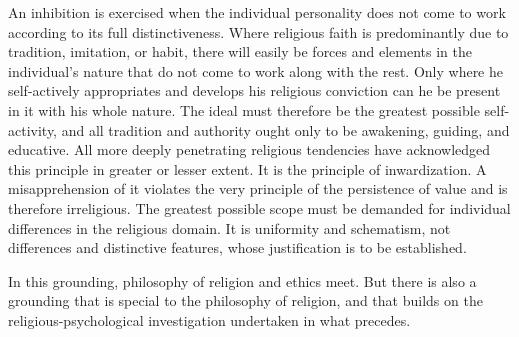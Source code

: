\documentclass[12pt,a4paper]{book}
\begin{document}
An inhibition is exercised when the individual personality does not come to work according to its full
distinctiveness. Where religious faith is predominantly due to tradition, imitation, or habit, there
will easily be forces and elements in the individual's nature that do not come to work along with the
rest. Only where he self-actively appropriates and develops his religious conviction can he be present
in it with his whole nature. The ideal must therefore be the greatest possible self-activity, and all
tradition and authority ought only to be awakening, guiding, and educative. All more deeply penetrating
religious tendencies have acknowledged this principle in greater or lesser extent. It is the principle
of inwardization. A misapprehension of it violates the very principle of the persistence of value and
is therefore irreligious. The greatest possible scope must be demanded for individual differences in
the religious domain. It is uniformity and schematism, not differences and distinctive features, whose
justification is to be established.

In this grounding, philosophy of religion and ethics meet. But there is also a grounding that is
special to the philosophy of religion, and that builds on the religious-psychological investigation
undertaken in what precedes.
\end{document}
